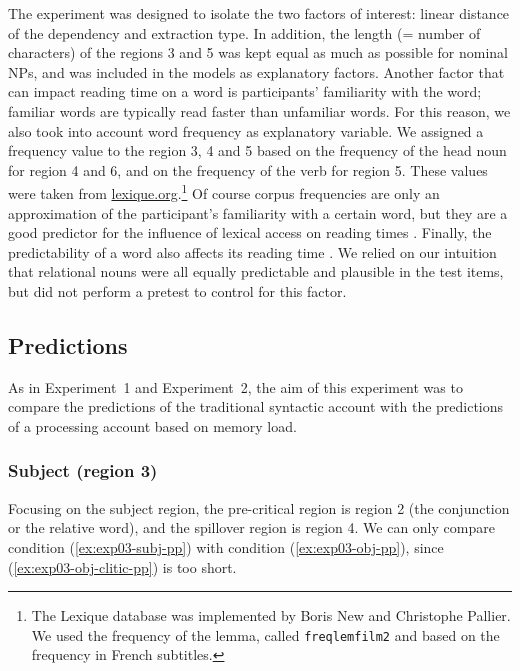 The experiment was designed to isolate the two factors of interest: linear distance of the dependency and extraction type. In addition, the length (= number of characters) of the regions 3 and 5 was kept equal as much as possible for nominal NPs, and was included in the models as explanatory factors. Another factor that can impact reading time on a word is participants' familiarity with the word; familiar words are typically read faster than unfamiliar words. For this reason, we also took into account word frequency as explanatory variable. We assigned a frequency value to the region 3, 4 and 5 based on the frequency of the head noun for region 4 and 6, and on the frequency of the verb for region 5. These values were taken from \url{lexique.org}.\footnote{The Lexique database was implemented by Boris New and Christophe Pallier. We used the frequency of the lemma, called \texttt{freqlemfilm2} and based on the frequency in French subtitles.}
Of course corpus frequencies are only an approximation of the participant's familiarity with a certain word, but they are a good predictor for the influence of lexical access on reading times \citep{Rayner.1986}. Finally, the predictability of a word also affects its reading time \citep{Ehrlich.1981}. We relied on our intuition that relational nouns were all equally predictable and plausible in the test items, but did not perform a pretest to control for this factor.

\subsection{Predictions}
\label{ch:exp03-predictions}

As in Experiment~1 and Experiment~2, the aim of this experiment was to compare the predictions of the traditional syntactic account with the predictions of a processing account based on memory load.

\subsubsection{Subject (region 3)}

Focusing on the subject region, the pre-critical region is region 2 (the conjunction or the relative word), and the spillover region is region 4. We can only compare condition (\ref{ex:exp03-subj-pp}) with condition (\ref{ex:exp03-obj-pp}), since (\ref{ex:exp03-obj-clitic-pp}) is too short.

